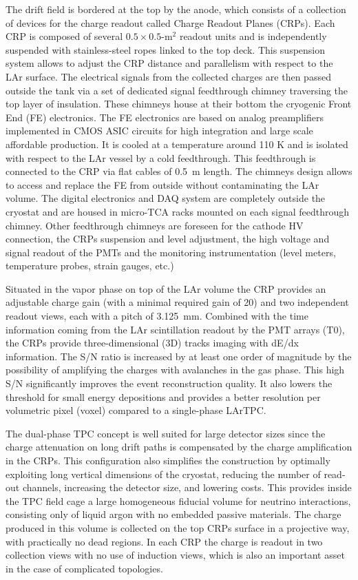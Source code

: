 The drift field is %
bordered at the top by the anode, which consists of a
collection of %
devices for the charge readout called Charge Readout Planes %
(CRPs). Each CRP is composed of several $0.5\times 0.5$-m$^2$ readout
units and is independently suspended with stainless-steel ropes
linked to the top deck. This suspension system allows to adjust the
CRP distance and parallelism with respect to the LAr surface. The
electrical signals from the collected charges are then passed outside
the tank via a set of dedicated signal feedthrough chimney traversing
the top layer of insulation. These chimneys house at their bottom the
cryogenic Front End (FE) electronics.  The FE electronics are based on
analog preamplifiers implemented in CMOS ASIC circuits for high
integration and large scale affordable production. It is cooled at a
temperature around 110 K and is isolated with respect to the LAr
vessel by a cold feedthrough. This feedthrough is connected to the CRP
via flat cables of 0.5~m length. The chimneys design allows to access
and replace the FE from outside without contaminating the LAr
volume. The digital electronics and DAQ system are completely outside
the cryostat and are housed in micro-TCA racks mounted on each signal
feedthrough chimney. Other feedthrough chimneys are foreseen for the
cathode HV connection, the CRPs suspension and level adjustment, the
high voltage and signal readout of the PMTs and the monitoring
instrumentation (level meters, temperature probes, strain gauges,
etc.)

Situated in the vapor phase on top of the LAr volume the CRP provides
an adjustable charge gain (with a minimal required gain of 20) and two
independent readout views, each with a pitch of 3.125~mm.  Combined
with the time information coming from the LAr scintillation readout by
the PMT arrays (T0), the CRPs provide three-dimensional (3D) tracks
imaging with dE/dx information. The S/N ratio is increased by at least
one order of magnitude by the possibility of amplifying the charges
with avalanches in the gas phase.  This high S/N significantly
improves the event reconstruction quality. It also lowers the
threshold for small energy depositions and provides a better
resolution per volumetric pixel (voxel) compared to a 
single-phase LArTPC.

The dual-phase TPC concept is well suited for large detector sizes
since the charge attenuation on long drift paths is compensated by the
charge amplification in the CRPs.  This configuration also simplifies
the construction by optimally exploiting long vertical dimensions of
the cryostat, reducing the number of read-out channels, increasing the
detector size, and lowering costs.  This provides inside the TPC field
cage a large homogeneous fiducial volume for neutrino interactions,
consisting only of liquid argon with no embedded passive
materials. The charge produced in this volume is collected on the top
CRPs surface in a projective way, with practically no dead regions. In
each CRP the charge is readout in two collection views with no use of
induction views, which is also an important asset in the case of
complicated topologies.

